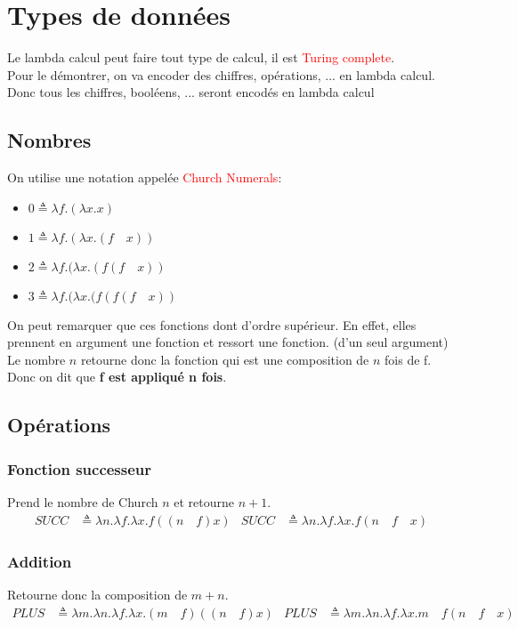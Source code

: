 \documentclass{report}
\begin{document}
\section{Types de données}
Le lambda calcul peut faire tout type de calcul, il est \textcolor{red}{Turing complete}.\\
Pour le démontrer, on va encoder des chiffres, opérations, ... en lambda calcul. Donc tous les chiffres, booléens, ... seront encodés en lambda calcul

\subsection{Nombres}
On utilise une notation appelée \textcolor{red}{Church Numerals}:
\begin{itemize}
\item $0 \triangleq \lambda f.(\lambda x.x)$
\item $1 \triangleq \lambda f.(\lambda x.(f \quad x))$
\item $2 \triangleq \lambda f.(\lambda x.(f (f \quad x))$
\item $3 \triangleq \lambda f.(\lambda x.(f (f (f \quad x))$
\end{itemize}
On peut remarquer que ces fonctions dont d'ordre supérieur. En effet, elles prennent en argument une fonction et ressort une fonction. (d'un seul argument)\\
Le nombre $n$ retourne donc la fonction qui est une composition de $n$ fois de f. Donc on dit que \textbf{f est appliqué n fois}.

\subsection{Opérations}
\subsubsection{Fonction successeur}
Prend le nombre de Church $n$ et retourne $n+1$.
\begin{align*}
SUCC &\triangleq \lambda n.\lambda f.\lambda x.f((n \quad f)x) & SUCC &\triangleq \lambda n.\lambda f.\lambda x.f(n \quad f \quad x)
\end{align*}

\subsubsection{Addition}
Retourne donc la composition de $m+n$.
\begin{align*}
PLUS &\triangleq \lambda m.\lambda n.\lambda f	. \lambda x.(m \quad f)((n \quad f)x) & PLUS &\triangleq \lambda m.\lambda n.\lambda f	. \lambda x.m \quad f(n \quad f \quad x)
\end{align*}
\end{document}
